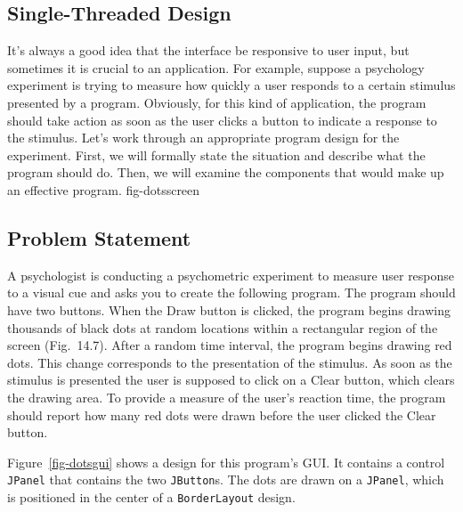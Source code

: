 \subsection{Single-Threaded Design}
\noindent It's always a good idea that the interface be responsive to
user input, but sometimes it is crucial to an application.  For
example, suppose a psychology experiment is trying to measure how
quickly a user responds to a certain stimulus presented by a program.
Obviously, for this kind of application, the program should take
action as soon as the user clicks a button to indicate a response to
the stimulus. Let's work through an appropriate program design for
the experiment. First, we will formally state the situation and
describe what the program should do.  Then, we will examine the
components that would make up an effective program.
{fig-dotsscreen}


\subsection*{Problem Statement}
\noindent A psychologist is conducting a psychometric experiment to measure user
response to a visual cue and asks you to create the following
program.  The program should have two buttons.  When the Draw button
is clicked, the program begins drawing thousands of black dots at
random locations within a rectangular region of the screen
(Fig.~14.7).  After a random time interval, the
program begins drawing red dots.  This change corresponds to the
presentation of the stimulus.  As soon as the stimulus is presented
the user is supposed to click on a Clear button, which clears the
drawing area.  To provide a measure of the user's reaction time, the
program should report how many red dots were drawn before the user
clicked the Clear button.

\pagebreak
Figure~\ref{fig-dotsgui} shows a design for this program's GUI.
It contains a control {\tt JPanel} that contains the two
{\tt JButton}s.  The dots are drawn on a {\tt JPanel}, which is
positioned in the center of a {\tt BorderLayout} design. 

